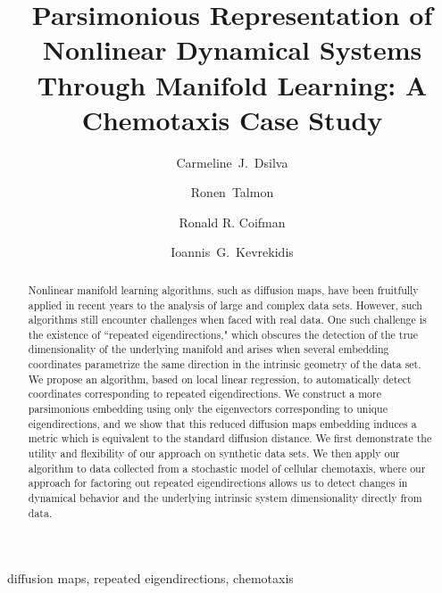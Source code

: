 \documentclass[3p]{elsarticle}
\begin{document}
\begin{frontmatter}

\title{Parsimonious Representation of Nonlinear Dynamical Systems Through Manifold Learning: A Chemotaxis Case Study}

\author[princeton]{Carmeline~J.~Dsilva}
%
\author[technion]{Ronen~Talmon}
%
\author[yale]{Ronald R. Coifman}
%
\author[princeton,princetonpacm]{Ioannis~G.~Kevrekidis }

\address[princeton]{Department of Chemical and Biological Engineering, Princeton University, Princeton, NJ, 08540, USA}
\address[technion]{Department of Electrical Engineering, Technion - Israel Institute of Technology, Haifa, 3200003, Israel}
\address[yale]{Department of Mathematics, Yale University, New Haven, CT, 06520, USA}
\address[princetonpacm]{Program in Applied and Computational Mathematics, Princeton University, Princeton, NJ, 08540, USA}
%


\begin{abstract}
%
Nonlinear manifold learning algorithms, such as diffusion maps, have been fruitfully
applied in recent years to the analysis of large and complex data sets.
%
However, such algorithms still encounter challenges when faced with real data.
%
One such 
challenge is the existence of ``repeated eigendirections," which obscures the detection of the 
true dimensionality of the underlying manifold and arises when several embedding coordinates parametrize
the same direction in the intrinsic geometry of the data set. 
%
We propose an algorithm, based on local linear regression, 
to automatically detect coordinates corresponding to repeated eigendirections.
%
We construct a more parsimonious embedding using only the eigenvectors corresponding to unique eigendirections, and we show that this reduced diffusion maps embedding induces 
a metric which is equivalent to the standard diffusion distance.
%
We first demonstrate the utility and flexibility of our approach on synthetic data sets.
%
We then apply our algorithm to data collected from a stochastic model of cellular chemotaxis, where our approach for factoring out repeated eigendirections allows us to detect changes in dynamical behavior and the underlying
intrinsic system dimensionality directly from data.
%
\end{abstract}


\begin{keyword}
diffusion maps, repeated eigendirections, chemotaxis
\end{keyword}

\end{frontmatter}
\end{document}
